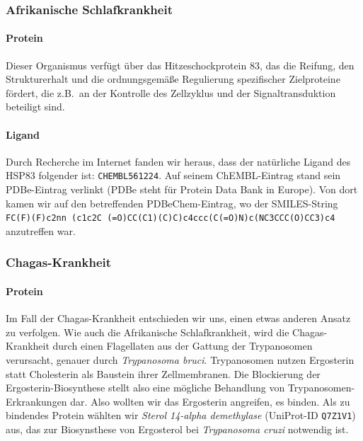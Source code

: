 \documentclass[10pt]{article}
\begin{document}
    \subsubsection{Afrikanische Schlafkrankheit}\label{subsubsec:afrikanische-schlafkrankheit}

    \paragraph{Protein}
    Dieser Organismus verfügt über das Hitzeschockprotein 83, das die Reifung, den Strukturerhalt und die
    ordnungsgemäße Regulierung spezifischer Zielproteine fördert, die z.B.\ an der Kontrolle des Zellzyklus und der
    Signaltransduktion beteiligt sind.

    \paragraph{Ligand}
    Durch Recherche im Internet fanden wir heraus, dass der natürliche Ligand des HSP83 folgender
    ist: \texttt{CHEMBL561224}. Auf seinem ChEMBL-Eintrag stand sein PDBe-Eintrag verlinkt (PDBe steht für Protein
    Data Bank
    in Europe). Von dort kamen wir auf den betreffenden PDBeChem-Eintrag, wo der SMILES-String \texttt{FC(F)(F)c2nn
        (c1c2C
        (=O)CC(C1)(C)C)c4ccc(C(=O)N)c(NC3CCC(O)CC3)c4} anzutreffen war.

    \subsubsection{Chagas-Krankheit}\label{subsubsec:chagas-krankheit}

    \paragraph{Protein}
    Im Fall der Chagas-Krankheit entschieden wir uns, einen etwas anderen Ansatz zu verfolgen. Wie auch die Afrikanische
    Schlafkrankheit, wird die Chagas-Krankheit durch einen Flagellaten aus der Gattung der Trypanosomen
    verursacht, genauer durch \emph{Trypanosoma bruci}.\cite{5} Trypanosomen nutzen Ergosterin statt Cholesterin
    als Baustein
    ihrer
    Zellmembranen.\cite{31} Die Blockierung der Ergosterin-Biosynthese stellt also eine mögliche Behandlung von
    Trypanosomen-Erkrankungen dar. Also wollten wir das Ergosterin angreifen, es binden. Als zu bindendes Protein
    wählten wir \emph{Sterol 14-alpha demethylase} (UniProt-ID \texttt{Q7Z1V1}) aus, das zur Biosynsthese von
    Ergosterol bei
    \emph{Trypanosoma cruzi} notwendig ist.
\end{document}
